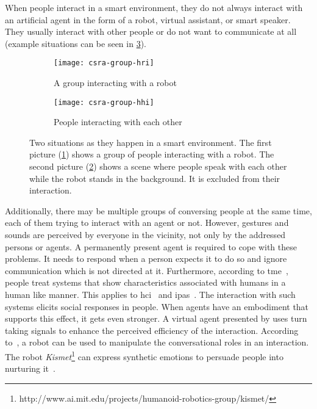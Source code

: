 When people interact in a \gls{smart environment}, they do not always interact with an \gls{artificial agent} in the form of a \gls{robot}, virtual assistant, or smart speaker.
They usually interact with other people or do not want to communicate at all (example situations can be seen in \cref{fig:intro}).
\begin{figure}[htbp]
	\centering
	\begin{subfigure}[t]{0.49\textwidth}
	\texttt{[image: csra-group-hri]}
		\caption{A group interacting with a robot}
		\label{fig:intro.hri}
	\end{subfigure}
	\hfill
	\begin{subfigure}[t]{0.49\textwidth}
	\texttt{[image: csra-group-hhi]}
		\caption{People interacting with each other}
		\label{fig:intro.hhi}
	\end{subfigure}
	\caption[Interaction with a robot and excluding a robot.]{\label{fig:intro} Two situations as they happen in a \gls{smart environment}. The first picture (\ref{fig:intro.hri}) shows a group of people interacting with a \gls{robot}. The second picture (\ref{fig:intro.hhi}) shows a scene where people speak with each other while the \gls{robot} stands in the background. It is excluded from their interaction.}
\end{figure}
Additionally, there may be multiple groups of conversing people at the same time, each of them trying to interact with an agent or not.
However, gestures and sounds are perceived by everyone in the vicinity, not only by the addressed persons or agents. 
A permanently present agent is required to cope with these problems.
It needs to respond when a person expects it to do so and ignore communication which is not directed at it.
Furthermore, according to \gls{tme}~\cite[]{Reeves1996}, people treat systems that show characteristics associated with humans in a human like manner.
This applies to \gls{hci}~\cite[]{Nass1994} and \glspl{ipa}~\cite[]{Lopatovska2018}.
The interaction with such systems elicits social responses in people.
When agents have an embodiment that supports this effect, it gets even stronger.
A \gls{virtual agent} presented by  uses \gls{turn taking} signals to enhance the perceived efficiency of the interaction.
According to~, a \gls{robot} can be used to manipulate the \glspl{conversational role} in an interaction.
The \gls{robot} \emph{Kismet}\footnote{http://www.ai.mit.edu/projects/humanoid-robotics-group/kismet/} can express synthetic emotions to persuade people into nurturing it~\cite{Breazeal1999b}.
